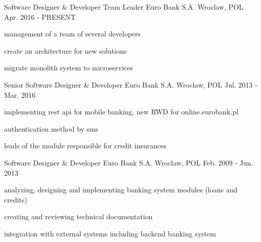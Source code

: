 

\begin{cventries}

  \cventry
    {Software Designer \& Developer \/ Team Leader} %
    {Euro Bank S.A.} %
    {Wroclaw, POL} %
    {Apr. 2016 - PRESENT} %
    {
      \begin{cvitems} %
        \item {management of a team of several developers}
        \item {create an architecture for new solutions}
        \item {migrate monolith system to microservices}
      \end{cvitems}
    }

  \cventry
    {Senior Software Designer \& Developer} %
    {Euro Bank S.A.} %
    {Wroclaw, POL} %
    {Jul. 2013 - Mar. 2016} %
    {
      \begin{cvitems} %
        \item {implementing rest api for mobile banking, new RWD for online.eurobank.pl}
        \item {authentication method by sms}
        \item {leads of the module responsible for credit insurances}
      \end{cvitems}
    }

  \cventry
    {Software Designer \& Developer} %
    {Euro Bank S.A.} %
    {Wroclaw, POL} %
    {Feb. 2009 - Jun. 2013} %
    {
      \begin{cvitems} %
        \item {analyzing, designing and implementing banking system modules (loans and credits)}
        \item {creating and reviewing technical documentation}
        \item {integration with external systems including backend banking system}
      \end{cvitems}
    }



\end{cventries}
